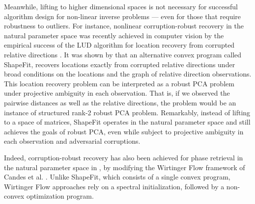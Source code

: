 \documentclass[12pt]{article}
\newcommand{\1}{\mathbbm{1}}
\begin{document}
Meanwhile, lifting to higher dimensional spaces is not necessary for successful algorithm design for non-linear inverse problems --- even for those that require  robustness to outliers. For instance, nonlinear corruption-robust recovery in the natural parameter space was recently achieved in computer vision by the empirical success of the LUD algorithm for location recovery from corrupted relative directions \cite{Amit}. It was shown by \cite{ShapeFit} that an alternative convex program called ShapeFit, recovers locations exactly from corrupted relative directions under broad conditions on the locations and the graph of relative direction observations. This location recovery problem can be interpreted as a robust PCA problem under projective ambiguity in each observation. That is, if we observed the pairwise distances as well as the relative directions, the problem would be an instance of structured rank-2 robust PCA problem. Remarkably, instead of lifting to a space of matrices, ShapeFit operates in the natural parameter space and still achieves the goals of robust PCA, even while subject to projective ambiguity in each observation and adversarial corruptions. 

Indeed, corruption-robust recovery has also been achieved for phase retrieval in the natural parameter space in \cite{medianwirtingerflow}, by modifying the Wirtinger Flow framework of Candes et al. \cite{wirtinger,cai2015optimal}. Unlike ShapeFit, which consists of a single convex program, Wirtinger Flow approaches rely on a spectral initialization, followed by a non-convex optimization program. 
\end{document}
